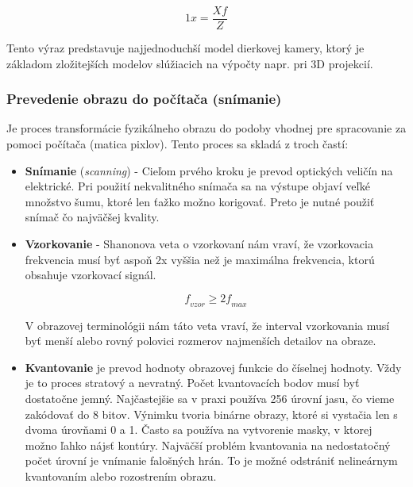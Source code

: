 \begin{equation}{1}
    \textit{x}=\frac{X\textit{f}}{Z}
\end{equation}

Tento výraz predstavuje najjednoduchší model dierkovej kamery, ktorý je základom zložitejších modelov slúžiacich na výpočty napr. pri 3D projekcií. 

\subsubsection{Prevedenie obrazu do počítača (snímanie)}
Je proces transformácie fyzikálneho obrazu do podoby vhodnej pre spracovanie za pomoci počítača (matica pixlov). Tento proces sa skladá z troch častí:
\begin{itemize}
\item \textbf{Snímanie} (\textit{scanning}) - Cieľom prvého kroku je prevod optických veličín na elektrické. Pri použití nekvalitného snímača sa na výstupe objaví veľké množstvo šumu, ktoré len ťažko možno korigovať. Preto je nutné použiť snímač čo najväčšej kvality. \cite{Analysis_and_Machine_Vision}

\item \textbf{Vzorkovanie} \cite{Analysis_and_Machine_Vision} - Shanonova veta o vzorkovaní nám vraví, že vzorkovacia frekvencia musí byť aspoň 2x vyššia než je maximálna frekvencia, ktorú obsahuje vzorkovací signál. \cite{Analysis_and_Machine_Vision}

\begin{equation}
    \textit{f}_{\textit{vzor}} \ge {2} \textit{f}_{\textit{max}}
\end{equation}

V obrazovej terminológii nám táto veta vraví, že interval vzorkovania musí byť menší alebo rovný polovici rozmerov najmenších detailov na obraze. 

\item \textbf{Kvantovanie} je prevod hodnoty obrazovej funkcie do číselnej hodnoty. Vždy je to proces stratový a nevratný. Počet kvantovacích bodov musí byť dostatočne jemný. Najčastejšie sa v praxi používa 256 úrovní jasu, čo vieme zakódovať do 8 bitov. Výnimku tvoria binárne obrazy, ktoré si vystačia len s dvoma úrovňami 0 a 1. Často sa používa na vytvorenie masky, v ktorej možno ľahko nájsť kontúry. Najväčší problém kvantovania na nedostatočný počet úrovní je vnímanie falošných hrán. To je možné odstrániť nelineárnym kvantovaním alebo rozostrením obrazu. \cite{Analysis_and_Machine_Vision}



\end{itemize}
